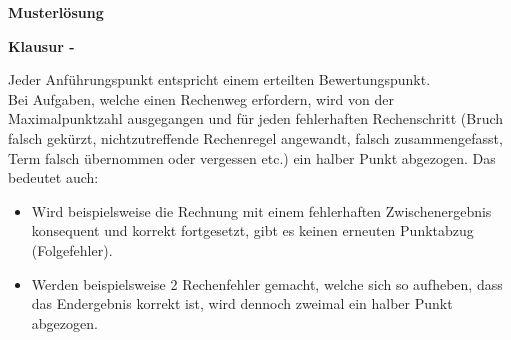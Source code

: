 \begin{center}
{\bf {\large Musterlösung}}
\end{center}

\begin{center}
{\bf {\large Klausur \submodule - \examdate}}
\end{center}

Jeder Anführungspunkt entspricht einem erteilten Bewertungspunkt. \\

Bei Aufgaben, welche einen Rechenweg erfordern, wird von der Maximalpunktzahl ausgegangen und für jeden fehlerhaften Rechenschritt (Bruch falsch gekürzt, nichtzutreffende Rechenregel angewandt, falsch zusammengefasst, Term falsch übernommen oder vergessen etc.) ein halber Punkt abgezogen. Das bedeutet auch:

\begin{itemize}
	\item Wird beispielsweise die Rechnung mit einem fehlerhaften Zwischenergebnis konsequent und korrekt fortgesetzt, gibt es keinen erneuten Punktabzug (Folgefehler).
	\item Werden beispielsweise 2 Rechenfehler gemacht, welche sich so aufheben, dass das Endergebnis korrekt ist, wird dennoch zweimal ein halber Punkt abgezogen.
\end{itemize}
